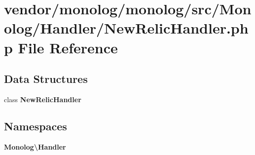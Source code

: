 \section{vendor/monolog/monolog/src/\+Monolog/\+Handler/\+New\+Relic\+Handler.php File Reference}
\label{_new_relic_handler_8php}
\subsection*{Data Structures}
\begin{DoxyCompactItemize}
\item 
class {\bf New\+Relic\+Handler}
\end{DoxyCompactItemize}
\subsection*{Namespaces}
\begin{DoxyCompactItemize}
\item 
 {\bf Monolog\textbackslash{}\+Handler}
\end{DoxyCompactItemize}
